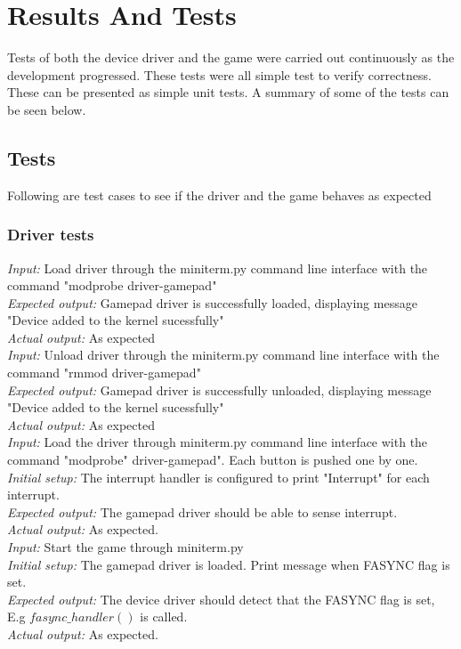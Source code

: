 \section{Results And Tests}
Tests of both the device driver and the game were carried out continuously as the development progressed. These tests were all simple test to verify correctness. These can be presented as simple unit tests. A summary of some of the tests can be seen below.  

\subsection{Tests}

Following are test cases to see if the driver and the game behaves as expected

\subsubsection{Driver tests}

\emph{Input: } Load driver through the miniterm.py command line interface with the command "modprobe driver-gamepad"\\
\emph{Expected output: } Gamepad driver is successfully loaded, displaying message "Device added to the kernel sucessfully"\\
\emph{Actual output: } As expected\\

\emph{Input: } Unload driver through the miniterm.py command line interface with the command "rmmod driver-gamepad"\\
\emph{Expected output: } Gamepad driver is successfully unloaded, displaying message "Device added to the kernel sucessfully"\\
\emph{Actual output: } As expected\\

\emph{Input: } Load the driver through miniterm.py command line interface with the command "modprobe" driver-gamepad". Each button is pushed one by one.\\
\emph{Initial setup: } The interrupt handler is configured to print "Interrupt" for each interrupt.\\
\emph{Expected output: } The gamepad driver should be able to sense interrupt.\\
\emph{Actual output: } As expected. \\ 

\emph{Input: } Start the game through miniterm.py  \\
\emph{Initial setup: } The gamepad driver is loaded. Print message when FASYNC flag is set.\\
\emph{Expected output: } The device driver should detect that the FASYNC flag is set, E.g $fasync\_handler()$ is called.\\ 
\emph{Actual output: } As expected. \\






